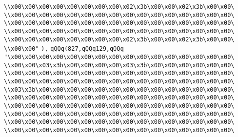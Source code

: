 \verb|\\x00\x00\x00\x00\x00\x00\x00\x00\x02\x3b\x00\x00\x02\x3b\x00\x00\|\newline
\verb|\\x00\x00\x00\x00\x00\x00\x00\x00\x00\x00\x00\x00\x00\x00\x00\x00\|\newline
\verb|\\x00\x00\x00\x00\x00\x00\x00\x00\x00\x00\x00\x00\x00\x00\x00\x00\|\newline
\verb|\\x00\x00\x00\x00\x00\x00\x00\x00\x00\x00\x00\x00\x00\x00\x00\x00\|\newline
\verb|\\x00\x00\x00\x00\x00\x00\x00\x00\x02\x3b\x00\x00\x02\x3b\x00\x00\|\newline
\verb|\\x00\x00"|\newline
\verb|),|\newline
\verb|qQQq(827,qQQq129,qQQq|\newline
\verb|"\x00\x00\x00\x00\x00\x00\x00\x00\x00\x00\x00\x00\x00\x00\x00\x00\|\newline
\verb|\\x00\x00\x03\x3b\x00\x00\x00\x00\x03\x3b\x00\x00\x00\x00\x00\x00\|\newline
\verb|\\x00\x00\x00\x00\x00\x00\x00\x00\x00\x00\x00\x00\x00\x00\x00\x00\|\newline
\verb|\\x00\x00\x00\x00\x00\x00\x00\x00\x00\x00\x00\x00\x00\x00\x00\x00\|\newline
\verb|\\x03\x3b\x00\x00\x00\x00\x00\x00\x00\x00\x00\x00\x00\x00\x00\x00\|\newline
\verb|\\x00\x00\x00\x00\x00\x00\x00\x00\x00\x00\x00\x00\x00\x00\x00\x00\|\newline
\verb|\\x00\x00\x00\x00\x00\x00\x00\x00\x00\x00\x00\x00\x00\x00\x00\x00\|\newline
\verb|\\x00\x00\x00\x00\x00\x00\x00\x00\x00\x00\x00\x00\x00\x00\x00\x00\|\newline
\verb|\\x00\x00\x00\x00\x00\x00\x00\x00\x00\x00\x00\x00\x00\x00\x00\x00\|\newline
\verb|\\x00\x00\x00\x00\x00\x00\x00\x00\x00\x00\x00\x00\x00\x00\x00\x00\|\newline

